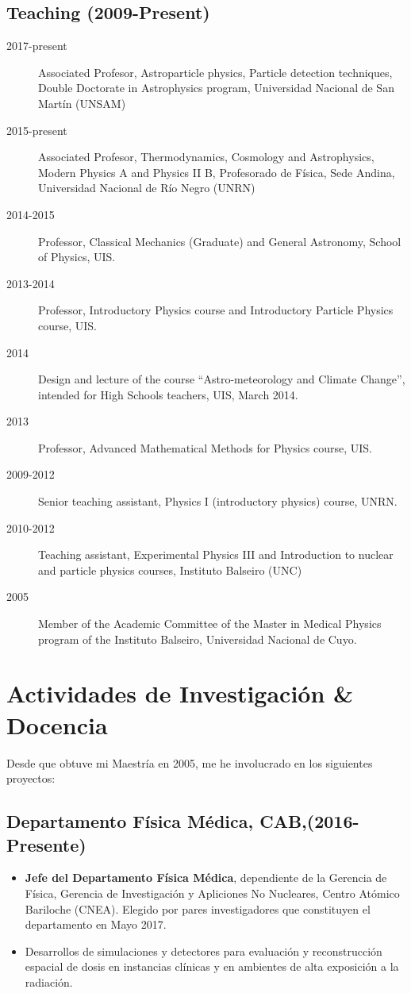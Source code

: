\subsection*{Teaching (2009-Present)}
\begin{description}
	\item[2017-present] Associated Profesor, Astroparticle physics, Particle detection techniques, Double Doctorate in Astrophysics program, Universidad Nacional de San Martín (UNSAM)
	\item[2015-present] Associated Profesor, Thermodynamics, Cosmology and Astrophysics, Modern Physics A and Physics II B, Profesorado de Física, Sede Andina, Universidad Nacional de Río Negro (UNRN)
	\item[2014-2015] Professor, Classical Mechanics (Graduate) and General Astronomy, School of Physics, UIS.
	\item[2013-2014] Professor, Introductory Physics course and Introductory Particle Physics course, UIS.
	\item[2014] Design and lecture of the course ``Astro-meteorology and Climate Change'', intended for High Schools teachers, UIS, March 2014.
	\item[2013] Professor, Advanced Mathematical Methods for Physics course, UIS.
	\item[2009-2012] Senior teaching assistant, Physics I (introductory physics) course, UNRN.
	\item[2010-2012] Teaching assistant, Experimental Physics III and Introduction to nuclear and particle physics courses, Instituto Balseiro (UNC)
	\item[2005] Member of the Academic Committee of the Master in Medical Physics program of the Instituto Balseiro, Universidad Nacional de Cuyo.
\end{description}

\else
\section*{Actividades de Investigación \& Docencia}

Desde que obtuve mi Maestría en 2005, me he involucrado en los siguientes proyectos:

\subsection*{Departamento Física Médica, CAB,(2016-Presente)}

\begin{itemize}
	\item {\bf{Jefe del Departamento Física Médica}}, dependiente de la
		Gerencia de Física, Gerencia de Investigación y Apliciones No
		Nucleares, Centro Atómico Bariloche (CNEA). Elegido por pares
		investigadores que constituyen el departamento en Mayo 2017.
	\item Desarrollos de simulaciones y detectores para evaluación y
		reconstrucción espacial de dosis en instancias clínicas y en ambientes
		de alta exposición a la radiación.
\end{itemize}

